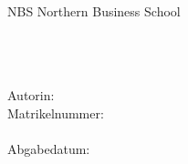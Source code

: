 
\begin{titlepage}

    \begin{tabbing}
    NBS Northern Business School\\
    \modulename \\
    \dozent \\
    \semester \\
    \end{tabbing}
    \vspace{5.5cm}

    {\begin{spacing}{2.45}
    \fontsize{20}{0}\textbf{\arbeitstitel}
    \end{spacing}}

    \vspace*{\fill}
    
    \begin{tabbing}
    Autorin: \studentname\\
    Matrikelnummer: \matrikelnummer\\
    \email\\
    Abgabedatum: \abgabetag\\
    \end{tabbing}
    
\end{titlepage}
